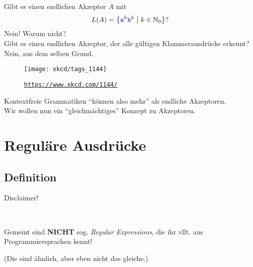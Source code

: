 

\begin{frame}[t]
	Gibt es einen endlichen Akzeptor $A$ mit $$L(A) = \left\{ \hbox{\textcolor{blue}{\texttt{a}}}^k\hbox{\textcolor{blue}{\texttt{b}}}^k \;\middle|\; k\in \mathbb{N}_0 \right\}?$$
	\pause
	Nein! Warum nicht? \\
	
	Gibt es einen endlichen Akzeptor, der alle gültigen Klammerausdrücke erkennt?\\ \pause
	Nein, aus dem selben Grund.
	\begin{figure}[H]
		\texttt{[image: xkcd/tags\_1144]}
		\caption{ \texttt{\url{https://www.xkcd.com/1144/}} }
	\end{figure}
	\pause
	Kontextfreie Grammatiken \enquote{können also mehr} als endliche Akzeptoren.\\
	Wir wollen nun ein \enquote{gleichmächtiges} Konzept zu Akzeptoren.
\end{frame}

\section{Reguläre Ausdrücke}
\subsection{Definition}

\begin{frame}{Disclaimer!}
	\begin{center}
		\Large
			 \\ \medskip
		
		Gemeint sind \textbf{NICHT} sog. \emph{Regular Expressions}, die ihr vllt. aus Programmiersprachen kennt! \\ \bigskip
		
		{\normalsize (Die sind ähnlich, aber eben nicht das gleiche.)}
	\end{center}
\end{frame}

